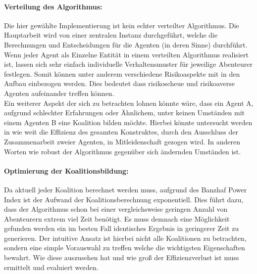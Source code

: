 \documentclass[fleqn,10pt]{SelfArx} %
\begin{document}
\paragraph{Verteilung des Algorithmus:}
Die hier gewählte Implementierung ist kein echter verteilter Algorithmus. Die Hauptarbeit wird von einer zentralen Instanz durchgeführt, welche die Berechnungen und Entscheidungen für die Agenten (in deren Sinne) durchführt. Wenn jeder Agent als Einzelne Entität in einem verteilten Algorithmus realisiert ist, lassen sich sehr einfach individuelle Verhaltensmuster für jeweilige Abenteurer festlegen. Somit können unter anderem verschiedene Risikoaspekte mit in den Aufbau einbezogen werden. Dies bedeutet dass risikoscheue und risikoaverse Agenten aufeinander treffen können. \\
Ein weiterer Aspekt der sich zu betrachten lohnen könnte wäre, dass ein Agent A, aufgrund schlechter Erfahrungen oder Ähnlichem, unter keinen Umständen mit einem Agenten B eine Koalition bilden möchte. Hierbei könnte untersucht werden in wie weit die Effizienz des gesamten Konstruktes, durch den Ausschluss der Zusammenarbeit zweier Agenten, in Mitleidenschaft gezogen wird. In anderen Worten wie robust der Algorithmus gegenüber sich ändernden Umständen ist.

\paragraph{Optimierung der Koalitionsbildung:}
Da aktuell jeder Koalition berechnet werden muss, aufgrund des Banzhaf Power Index ist der Aufwand der Koalitionsberechnung exponentiell. Dies führt dazu, dass der Algorithmus schon bei einer vergleichsweise geringen Anzahl von Abenteurern extrem viel Zeit benötigt. Es muss demnach eine Möglichkeit gefunden werden ein im besten Fall identisches Ergebnis in geringerer Zeit zu generieren. Der intuitive Ansatz ist hierbei nicht alle Koalitionen zu betrachten, sondern eine simple Vorauswahl zu treffen welche die wichtigsten Eigenschaften bewahrt. Wie diese auszusehen hat und wie groß der Effizienzverlust ist muss ermittelt und evaluiert werden.
\end{document}
